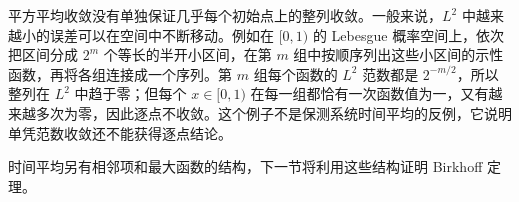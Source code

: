 \begin{remark}[范数收敛与逐点收敛]\label{b1:rem:norm-not-pointwise-32}
平方平均收敛没有单独保证几乎每个初始点上的整列收敛。一般来说，\(L^2\) 中越来越小的误差可以在空间中不断移动。例如在 \([0,1)\) 的 Lebesgue 概率空间上，依次把区间分成 \(2^m\) 个等长的半开小区间，在第 \(m\) 组中按顺序列出这些小区间的示性函数，再将各组连接成一个序列。第 \(m\) 组每个函数的 \(L^2\) 范数都是 \(2^{-m/2}\)，所以整列在 \(L^2\) 中趋于零；但每个 \(x\in[0,1)\) 在每一组都恰有一次函数值为一，又有越来越多次为零，因此逐点不收敛。这个例子不是保测系统时间平均的反例，它说明单凭范数收敛还不能获得逐点结论。
\end{remark}

时间平均另有相邻项和最大函数的结构，下一节将利用这些结构证明 Birkhoff 定理。
